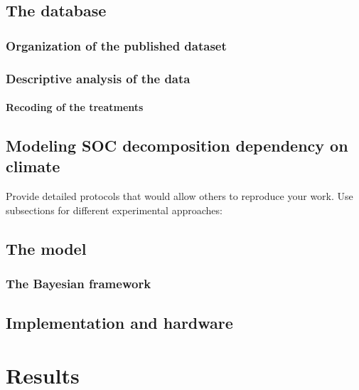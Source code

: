 \documentclass[12pt,a4paper]{article}
\begin{document}
\subsection{The database}

\subsubsection{Organization of the published dataset}


\subsubsection{Descriptive analysis of the data}

\paragraph{Recoding of the treatments}


\subsection{Modeling SOC decomposition dependency on climate}

Provide detailed protocols that would allow others to reproduce your work. Use subsections for different experimental approaches:




\subsection{The model}

\subsubsection{The Bayesian framework}

\subsection{Implementation and hardware}




\section{Results}
\end{document}
